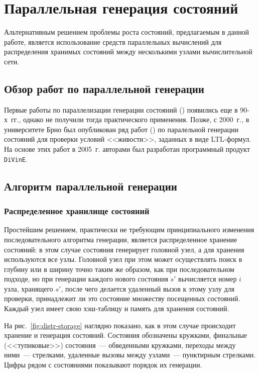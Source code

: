 \chapter{Параллельная генерация состояний}
\label{sec:par-statespace}

Альтернативным решением проблемы роста состояний, предлагаемым в данной работе, является
использование средств параллельных вычислений для распределения хранимых состояний между
несколькими узлами вычислительной сети.

\section{Обзор работ по параллельной генерации}
\label{sec:par-analogues}

Первые работы по параллелизации генерации состояний (\cite{LS99}) появились еще в
90-х~гг., однако не получили тогда практического применения. Позже, с 2000~г., в
университете Брно был опубликован ряд работ (\cite{DLTL1,DLTL2}) по паралельной
генерации состояний для проверки условий <<живости>>, заданных в виде LTL-формул. На
основе этих работ в 2005~г. авторами был разработан программный продукт
\texttt{DiVinE}.~\cite{DiVinE}

\section{Алгоритм параллельной генерации}
\label{sec:par-algo}

\subsection{Распределенное хранилище состояний}
\label{sec:distr-storage}

Простейшим решением, практически не требующим принципиального изменения последовательного
алгоритма генерации, является распределенное хранение состояний: в этом случае состояния
генерирует головной узел, а для хранения используются все узлы. Головной узел при этом
может осуществлять поиск в глубину или в ширину точно таким же образом, как при
последовательном подходе, но при генерации каждого нового состояния $s'$ вычисляется номер
$i$ узла, хранящего $s'$, после чего делается удаленный вызов к этому узлу для проверки,
принадлежит ли это состояние множеству  посещенных состояний. Каждый узел
имеет свою хэш-таблицу и память для хранения состояний.

На рис.~\ref{fig:distr-storage} наглядно показано, как в этом случае происходит хранение и
генерация состояний. Состояния обозначены кружками, финальные (<<тупиковые>>) состояния~---
обведенными кружками, переходы между ними~--- стрелками, удаленные вызовы между узлами~---
пунктирным стрелками. Цифры рядом с состояниями показывают порядок их генерации.

